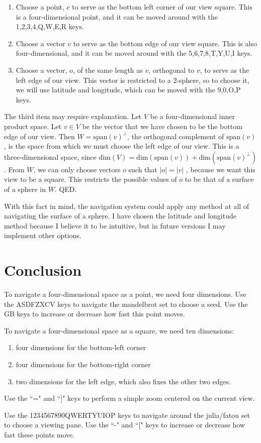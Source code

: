 \documentclass[a4paper]{article}
\begin{document}
\begin{enumerate}
    \item Choose a point, $c$ to serve as the bottom left corner of our view square.  This is a four-dimensional point, and it can be moved around with the 1,2,3,4,Q,W,E,R keys.
    \item Choose a vector $v$ to serve as the bottom edge of our view square.  This is also four-dimensional, and it can be moved around with the 5,6,7,8,T,Y,U,I keys.
    \item Choose a vector, $o$, of the same length as $v$, orthogonal to $v$, to serve as the left edge of our view.  This vector is restricted to a 2-sphere, so to choose it, we will use latitude and longitude, which can be moved with the 9,0,O,P keys.

\end{enumerate}

The third item may require explanation.  Let $V$ be a four-dimensional inner product space.  Let $v \in V$ be the vector that we have chosen to be the bottom edge of our view.  Then $W = \text{span}(v)^\perp$, the orthogonal complement of $\text{span}(v)$, is the space from which we must choose the left edge of our view.  This is a three-dimensional space, since $\text{dim}(V) = \text{dim}(\text{span}(v)) + \text{dim}(\text{span}(v)^\perp)$.  From $W$, we can only choose vectors $o$ such that $|o| = |v|$ , because we want this view to be a square.  This restricts the possible values of $o$ to be that of a surface of a sphere in $W$.  QED.

With this fact in mind, the navigation system could apply any method at all of navigating the surface of a sphere.  I have chosen the latitude and longitude method because I believe it to be intuitive, but in future versions I may implement other options.

\section{Conclusion}

To navigate a four-dimensional space as a point, we need four dimensions.  Use the ASDFZXCV keys to navigate the mandelbrot set to choose a seed.  Use the GB keys to increase or decrease how fast this point moves.

To navigate a four-dimensional space as a square, we need ten dimensions:
\begin{enumerate}
\item four dimensions for the bottom-left corner
\item four dimensions for the bottom-right corner
\item two dimensions for the left edge, which also fixes the other two edges.
\end{enumerate}

Use the ``=" and ``]" keys to perform a simple zoom centered on the current view.

Use the 1234567890QWERTYUIOP keys to navigate around the julia/fatou set to choose a viewing pane.  Use the ``-" and ``[" keys to increase or decrease how fast these points move.
\end{document}
